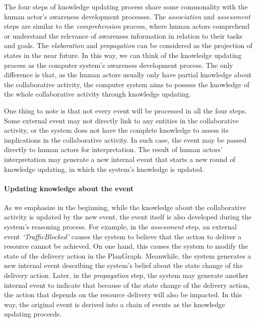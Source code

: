 The four steps of knowledge updating process share some commonality with the human actor's awareness development processes. The \emph{association} and \emph{assessment} steps are similar to the \emph{comprehension} process, where human actors comprehend or understand the relevance of awareness information in relation to their tasks and goals. The \emph{elaboration} and \emph{propagation} can be considered as the projection of states in the near future. In this way, we can think of the knowledge updating process as the computer system's awareness development process. The only difference is that, as the human actors usually only have partial knowledge about the collaborative activity, the computer system aims to possess the knowledge of the whole collaborative activity through knowledge updating.

One thing to note is that not every event will be processed in all the four steps. Some external event may not directly link to any entities in the collaborative activity, or the system does not have the complete knowledge to assess its implications in the collaborative activity. In such case, the event may be passed directly to human actors for interpretation. The result of human actors' interpretation may generate a new internal event that starts a new round of knowledge updating, in which the system's knowledge is updated.

\paragraph*{Updating knowledge about the event} %
\label{par:updating_the_event_representation}
As we emphasize in the beginning, while the knowledge about the collaborative activity is updated by the new event, the event itself is also developed during the system's reasoning process. For example, in the \emph{assessment} step, an external event \emph{`TrafficBlocked'} causes the system to believe that the action to deliver a resource cannot be achieved. On one hand, this causes the system to modify the state of the delivery action in the PlanGraph. Meanwhile, the system generates a new internal event describing the system's belief about the state change of the delivery action. Later, in the \emph{propagation} step, the system may generate another internal event to indicate that because of the state change of the delivery action, the action that depends on the resource delivery will also be impacted. In this way, the original event is derived into a chain of events as the knowledge updating proceeds.

